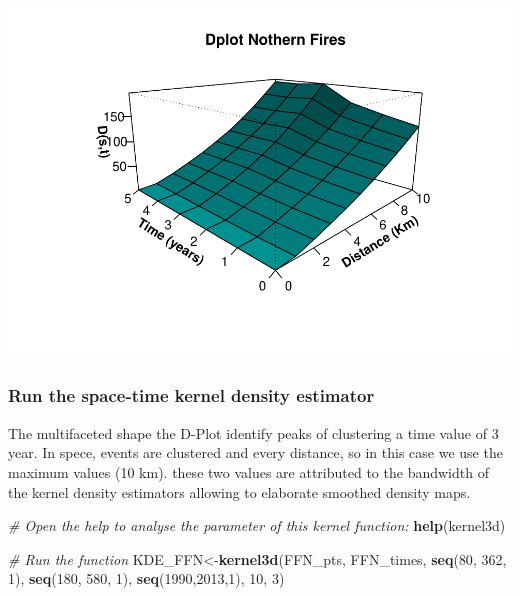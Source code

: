 \documentclass[
]{book}
\newenvironment{Shaded}{\begin{snugshade}}{\end{snugshade}}
\newcommand{\CommentTok}[1]{\textcolor[rgb]{0.56,0.35,0.01}{\textit{#1}}}
\newcommand{\DecValTok}[1]{\textcolor[rgb]{0.00,0.00,0.81}{#1}}
\newcommand{\FunctionTok}[1]{\textcolor[rgb]{0.13,0.29,0.53}{\textbf{#1}}}
\newcommand{\NormalTok}[1]{#1}
\newcommand{\OtherTok}[1]{\textcolor[rgb]{0.56,0.35,0.01}{#1}}
\begin{document}
\includegraphics{03-KDE_files/figure-latex/Dplot-1.pdf}

\hypertarget{run-the-space-time-kernel-density-estimator}{%
\subsubsection{Run the space-time kernel density estimator}\label{run-the-space-time-kernel-density-estimator}}

The multifaceted shape the D-Plot identify peaks of clustering a time value of 3 year.
In spece, events are clustered and every distance, so in this case we use the maximum values (10 km).
these two values are attributed to the bandwidth of the kernel density estimators allowing to elaborate smoothed density maps.

\begin{Shaded}
\begin{Highlighting}[]
\CommentTok{\# Open the help to analyse the parameter of this kernel function: }
\FunctionTok{help}\NormalTok{(kernel3d)}
\end{Highlighting}
\end{Shaded}

\begin{Shaded}
\begin{Highlighting}[]
\CommentTok{\# Run the function}
\NormalTok{KDE\_FFN}\OtherTok{\textless{}{-}}\FunctionTok{kernel3d}\NormalTok{(FFN\_pts, FFN\_times, }\FunctionTok{seq}\NormalTok{(}\DecValTok{80}\NormalTok{, }\DecValTok{362}\NormalTok{, }\DecValTok{1}\NormalTok{), }\FunctionTok{seq}\NormalTok{(}\DecValTok{180}\NormalTok{, }\DecValTok{580}\NormalTok{, }\DecValTok{1}\NormalTok{), }\FunctionTok{seq}\NormalTok{(}\DecValTok{1990}\NormalTok{,}\DecValTok{2013}\NormalTok{,}\DecValTok{1}\NormalTok{), }\DecValTok{10}\NormalTok{, }\DecValTok{3}\NormalTok{)}
\end{Highlighting}
\end{Shaded}
\end{document}
